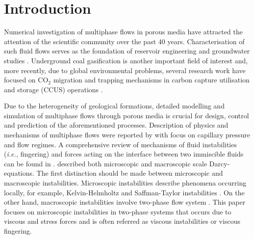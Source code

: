 \documentclass[preprint,authoryear,12pt]{elsarticle}
\newcommand{\red}{\textcolor{red}}
\newcommand{\ie}{{\it i.e., }}
\begin{document}
\section{Introduction}\label{section:intro}
\medskip
Numerical investigation of multiphase flows in porous media have attracted the attention of the scientific community over the past 40 years. Characterisation of such fluid flows serves as the foundation of reservoir engineering and groundwater studies \citep{white_1981}. %
Underground coal gasification is another important field of interest and, more recently, due to global environmental problems, several research work have focused on CO$_{\text{2}}$ migration and trapping mechanisms in carbon capture utilisation and storage (CCUS) operations \citep{spycher_2003, self_2012, jiang_2011}.

\medskip
Due to the heterogeneity of geological formations, detailed modelling and simulation of multiphase flows through porous media is crucial for design, control and prediction of the aforementioned processes. Description of physics and mechanisms of multiphase flows were reported by \citet{wooding_1976} with focus on capillary pressure and flow regimes. A comprehensive review of mechanisms of fluid instabilities (\ie fingering) and forces acting on the interface between two immiscible fluids can be found in \citet{homsy_1987}. \citet{adler_1988} described both microscopic and macroscopic scale Darcy-equations.
The first distinction should be made between microscopic and macroscopic instabilities. Microscopic instabilities describe phenomena occurring locally, for example, Kelvin-Helmholtz and Saffman-Taylor instabilities \citep{saffman_1959}. On the other hand, macroscopic instabilities involve two-phase flow system \citep{bottoni_1992}. This paper focuses on microscopic instabilities in two-phase systems that occurs due to viscous and stress forces and is often referred as viscous instabilities or viscous fingering.
\end{document}
